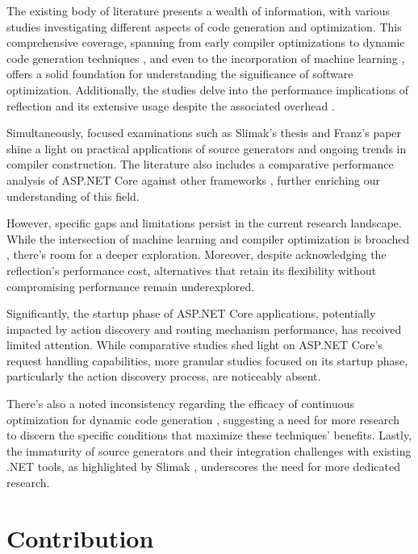 The existing body of literature presents a wealth of information, with various studies investigating different aspects of code generation and optimization. This comprehensive coverage, spanning from early compiler optimizations \cite{Aho2007} to dynamic code generation techniques \cite{Kistler2003}, and even to the incorporation of machine learning \cite{Shreyas2021}, offers a solid foundation for understanding the significance of software optimization. Additionally, the studies delve into the performance implications of reflection and its extensive usage despite the associated overhead \cite{Tudose2013, Beaumont2022}.

Simultaneously, focused examinations such as Slimak's thesis \cite{Slimak2022} and Franz's paper \cite{Franz2022} shine a light on practical applications of source generators and ongoing trends in compiler construction. The literature also includes a comparative performance analysis of ASP.NET Core against other frameworks \cite{Kronis2018, Karlsson2021}, further enriching our understanding of this field.

However, specific gaps and limitations persist in the current research landscape. While the intersection of machine learning and compiler optimization is broached \cite{Shreyas2021}, there's room for a deeper exploration. Moreover, despite acknowledging the reflection's performance cost, alternatives that retain its flexibility without compromising performance remain underexplored.

Significantly, the startup phase of ASP.NET Core applications, potentially impacted by action discovery and routing mechanism performance, has received limited attention. While comparative studies shed light on ASP.NET Core's request handling capabilities, more granular studies focused on its startup phase, particularly the action discovery process, are noticeably absent.

There's also a noted inconsistency regarding the efficacy of continuous optimization for dynamic code generation \cite{Kistler2003}, suggesting a need for more research to discern the specific conditions that maximize these techniques' benefits. Lastly, the immaturity of source generators and their integration challenges with existing .NET tools, as highlighted by Slimak \cite{Slimak2022}, underscores the need for more dedicated research.

\section{Contribution}

